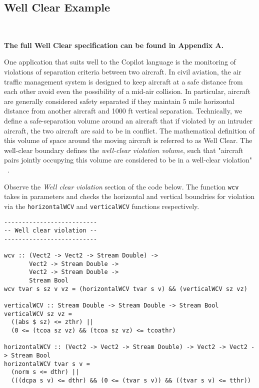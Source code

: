 \subsection{Well Clear Example}~\label{sec:WellClear}
\begin{center}
\textbf{The full Well Clear specification can be found in Appendix A.}
\end{center}

One application that suits well to the Copilot language is the
monitoring of violations of separation criteria between two aircraft.
In civil aviation, the air traffic management  system is designed to  keep
aircraft at a safe distance from each other avoid even the
possibility of a mid-air collision.  In particular,  aircraft are
generally considered safety separated if they maintain 5 mile
horizontal distance from another aircraft and 1000 ft vertical
separation. Technically,  we define  a safe-separation volume around an
aircraft that if violated by an intruder aircraft, the two aircraft
are said to be in conflict. The mathematical definition of this volume
of space around the  moving aircraft  is referred
to as Well Clear. The well-clear boundary defines  the
\emph{well-clear violation volume}, such that "aircraft pairs jointly
occupying this volume are considered to be in a well-clear violation"
~\cite{Munoz2015DASC}.

Observe the \emph{Well clear violation} section of the code below. The function {\tt wcv} takes in parameters and
checks the horizontal and vertical boundries for violation via the {\tt horizontalWCV} and {\tt verticalWCV} functions respectively. 

\begin{lstlisting}[language = copilot]
--------------------------
-- Well clear violation --
--------------------------

wcv :: (Vect2 -> Vect2 -> Stream Double) ->
       Vect2 -> Stream Double ->
       Vect2 -> Stream Double ->
       Stream Bool
wcv tvar s sz v vz = (horizontalWCV tvar s v) && (verticalWCV sz vz)

verticalWCV :: Stream Double -> Stream Double -> Stream Bool
verticalWCV sz vz =
  ((abs $ sz) <= zthr) ||
  (0 <= (tcoa sz vz) && (tcoa sz vz) <= tcoathr)

horizontalWCV :: (Vect2 -> Vect2 -> Stream Double) -> Vect2 -> Vect2 -> Stream Bool
horizontalWCV tvar s v =
  (norm s <= dthr) ||
  (((dcpa s v) <= dthr) && (0 <= (tvar s v)) && ((tvar s v) <= tthr))
\end{lstlisting}

